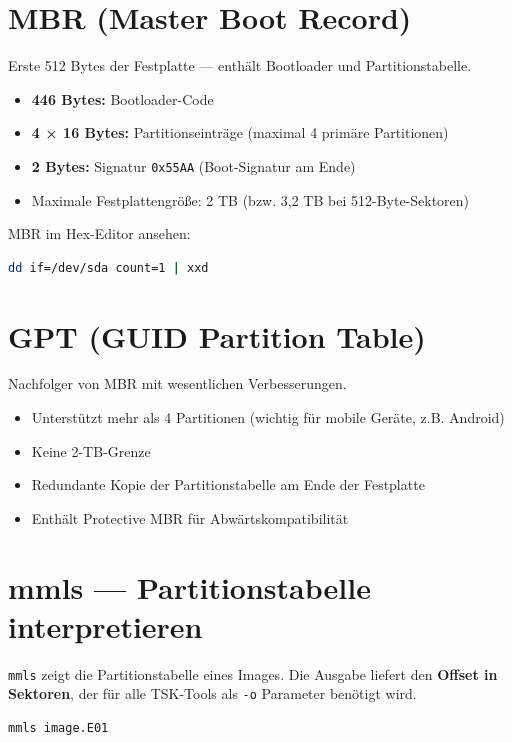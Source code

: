 \section{MBR (Master Boot Record)}

Erste 512 Bytes der Festplatte — enthält Bootloader und Partitionstabelle.

\begin{itemize}
	\item \textbf{446 Bytes:} Bootloader-Code
	\item \textbf{4 × 16 Bytes:} Partitionseinträge (maximal 4 primäre Partitionen)
	\item \textbf{2 Bytes:} Signatur \texttt{0x55AA} (Boot-Signatur am Ende)
	\item Maximale Festplattengröße: 2 TB (bzw. 3,2 TB bei 512-Byte-Sektoren)
\end{itemize}

MBR im Hex-Editor ansehen:
\begin{lstlisting}[language=bash]
dd if=/dev/sda count=1 | xxd
\end{lstlisting}

\section{GPT (GUID Partition Table)}

Nachfolger von MBR mit wesentlichen Verbesserungen.

\begin{itemize}
	\item Unterstützt mehr als 4 Partitionen (wichtig für mobile Geräte, z.B. Android)
	\item Keine 2-TB-Grenze
	\item Redundante Kopie der Partitionstabelle am Ende der Festplatte
	\item Enthält Protective MBR für Abwärtskompatibilität
\end{itemize}

\section{mmls — Partitionstabelle interpretieren}

\texttt{mmls} zeigt die Partitionstabelle eines Images.
Die Ausgabe liefert den \textbf{Offset in Sektoren}, der für alle TSK-Tools als \texttt{-o} Parameter benötigt wird.

\begin{lstlisting}[language=bash]
mmls image.E01
\end{lstlisting}

